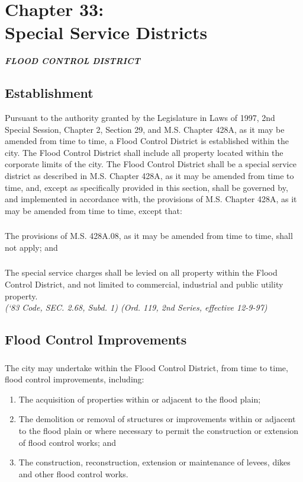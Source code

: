 \chapter*{Chapter 33: \\
	Special Service Districts}
    \minitoc
    \pagebreak
    
\begin{center}
    \textbf{\emph{\LARGE{FLOOD CONTROL DISTRICT}}}
\end{center}

\section{Establishment}
Pursuant to the authority granted by the Legislature in Laws of 1997, 2nd Special Session, Chapter 2, Section 29, and M.S. Chapter 428A, as it may be amended from time to time, a Flood Control District is established within the city.  The Flood Control District shall include all property located within the corporate limits of the city.  The Flood Control District shall be a special service district as described in M.S. Chapter 428A, as it may be amended from time to time, and, except as specifically provided in this section, shall be governed by, and implemented in accordance with, the provisions of M.S. Chapter 428A, as it may be amended from time to time, except that:
\subsection{}
The provisions of M.S. \textsection 428A.08, as it may be amended from time to time, shall not apply; and
\subsection{}
The special service charges shall be levied on all property within the Flood Control District, and not limited to commercial, industrial and public utility property.\\
\emph{(‘83 Code, SEC. 2.68, Subd. 1)  (Ord. 119, 2nd Series, effective 12-9-97)}
\section{Flood Control Improvements}
\subsection{}
The city may undertake within the Flood Control District, from time to time, flood control improvements, including:
\begin{enumerate}
    \item The acquisition of properties within or adjacent to the flood plain;
    \item The demolition or removal of structures or improvements within or adjacent to the flood plain or where necessary to permit the construction or extension of flood control works; and
    \item The construction, reconstruction, extension or maintenance of levees, dikes and other flood control works.
\end{enumerate}
